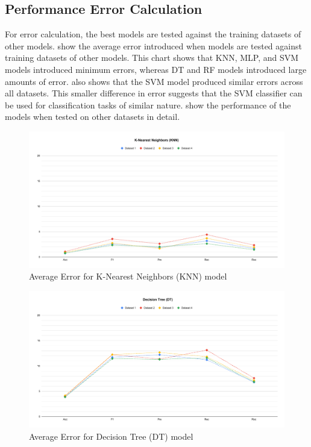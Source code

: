 \subsection{Performance Error Calculation}
For error calculation, the best models are tested against the training datasets of other models.  show the average error introduced when models are tested against training datasets of other models. This chart shows that KNN, MLP, and SVM models introduced minimum errors, whereas DT and RF models introduced large amounts of error.  also shows that the SVM model produced similar errors across all datasets. This smaller difference in error suggests that the SVM classifier can be used for classification tasks of similar nature.  show the performance of the models when tested on other datasets in detail.

\begin{figure}[ht]
    \centering
    \includegraphics[width=1.9\columnwidth]{media/ch_result_and_testing/delta_KNN.pdf}
    \caption{Average Error for K-Nearest Neighbors (KNN) model} \label{fig:perfromance_delta_knn}
\end{figure}

\begin{figure}[ht]
    \centering
    \includegraphics[width=1.9\columnwidth]{media/ch_result_and_testing/delta_DT.pdf}
    \caption{Average Error for Decision Tree (DT) model} \label{fig:perfromance_delta_dt}
\end{figure}

